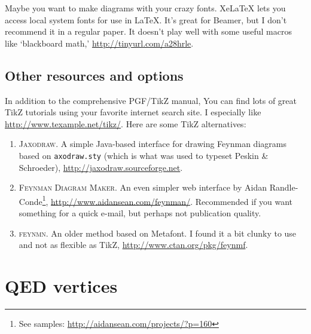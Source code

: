 \documentclass[12pt]{article}
\numberwithin{equation}{section}    %
\begin{document}
Maybe you want to make diagrams with your crazy fonts. XeLaTeX lets you access local system fonts for use in \LaTeX. It's great for Beamer, but I don't recommend it in a regular paper. It doesn't play well with some useful macros like `blackboard math,' \url{http://tinyurl.com/a28hrle}. 


\subsection{Other resources and options}

In addition to the comprehensive PGF/TikZ manual, You can find lots of great TikZ tutorials using your favorite internet search site. I especially like \url{http://www.texample.net/tikz/}. Here are some TikZ alternatives:
{\small
\begin{enumerate}
\item \textsc{Jaxodraw}. A simple Java-based interface for drawing Feynman diagrams based on \texttt{axodraw.sty} (which is what was used to typeset Peskin \& Schroeder), \url{http://jaxodraw.sourceforge.net}.

\item \textsc{Feynman Diagram Maker}. An even simpler web interface by Aidan Randle-Conde\footnote{See samples: \url{http://aidansean.com/projects/?p=160}}, \url{http://www.aidansean.com/feynman/}. Recommended if you want something for a quick e-mail, but perhaps not publication quality.

\item \textsc{feynmn}. An older method based on Metafont. I found it a bit clunky to use and not as flexible as TikZ, \url{http://www.ctan.org/pkg/feynmf}.

\end{enumerate}
}


\section{QED vertices}

\vspace{2em}

\end{document}
